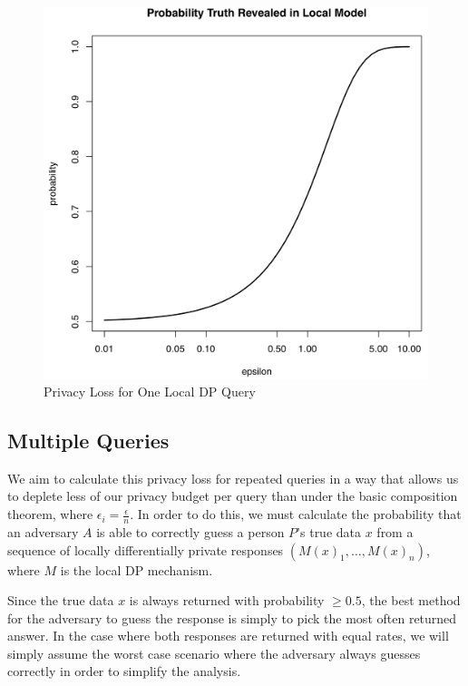 \documentclass[12pt]{article}
\theoremstyle{definition}
\begin{document}
\begin{figure}[H]
    \centering
    \includegraphics[scale=0.3]{single_query_probability.png}
    \caption{Privacy Loss for One Local DP Query}
    \label{fig:one_query}
\end{figure}

\subsection{Multiple Queries}

\noindent

We aim to calculate this privacy loss for repeated queries in a way that allows us to deplete less of our privacy budget per query than under the basic composition theorem, where $\epsilon_i = \frac{\epsilon}{n}$. In order to do this, we must calculate the probability that an adversary $A$ is able to correctly guess a person $P$'s true data $x$ from a sequence of locally differentially private responses $(M(x)_1, \dots, M(x)_n)$, where $M$ is the local DP mechanism.

\bigskip

Since the true data $x$ is always returned with probability $\geq 0.5$, the best method for the adversary to guess the response is simply to pick the most often returned answer. In the case where both responses are returned with equal rates, we will simply assume the worst case scenario where the adversary always guesses correctly in order to simplify the analysis.
\end{document}
